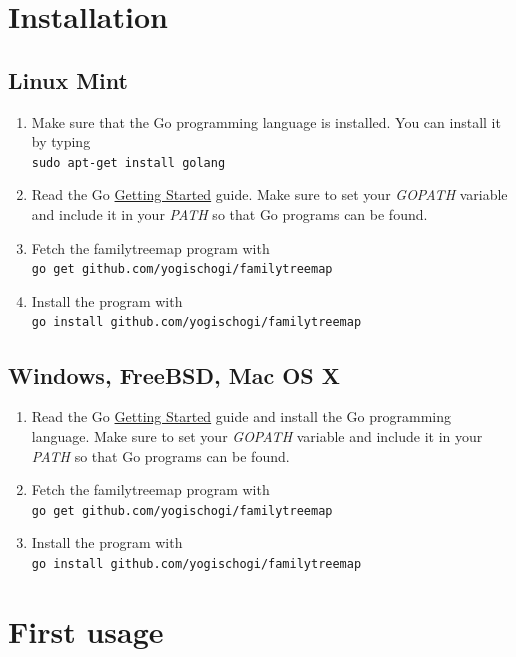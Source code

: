 \documentclass[12pt,a4paper]{article}
\begin{document}
\section{Installation}

\subsection{Linux Mint}
\begin{enumerate}
\item Make sure that the Go programming language is installed.
	You can install it by typing\\
	\texttt{sudo apt-get install golang}
\item Read the Go
	\href{http://golang.org/doc/install}{Getting Started}
	guide. Make sure to set your \emph{GOPATH} variable and
	include it in your \emph{PATH} so that Go programs can be
	found.
\item Fetch the familytreemap program with\\
	\texttt{go get github.com/yogischogi/familytreemap}
\item Install the program with\\
	 \texttt{go install github.com/yogischogi/familytreemap}
\end{enumerate}

\subsection{Windows, FreeBSD, Mac OS X}
\begin{enumerate}
\item Read the Go
	\href{http://golang.org/doc/install}{Getting Started}
	guide and install the Go programming language. 
	Make sure to set your \emph{GOPATH} variable and
	include it in your \emph{PATH} so that Go programs can be
	found.
\item Fetch the familytreemap program with\\
	\texttt{go get github.com/yogischogi/familytreemap}
\item Install the program with\\
	 \texttt{go install github.com/yogischogi/familytreemap}
\end{enumerate}


\section{First usage}
\end{document}

